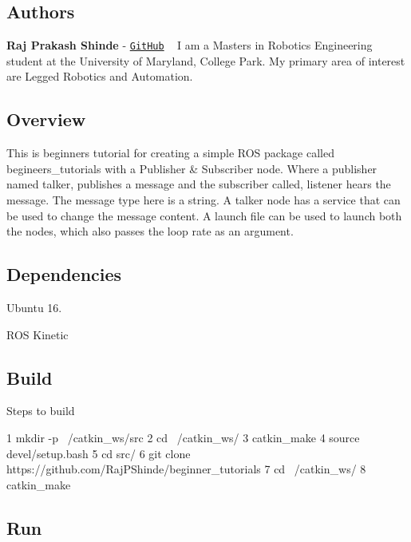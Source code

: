 \href{https://github.com/RajPShinde/begineer_tutorials/blob/master/LICENSE}{\tt } \href{https://github.com/RajPShinde/begineer_tutorials/blob/master/docs}{\tt }

\subsection*{Authors}

{\bfseries Raj Prakash Shinde} -\/ \href{https://github.com/RajPShinde}{\tt Git\+Hub} ~\newline
I am a Masters in Robotics Engineering student at the University of Maryland, College Park. My primary area of interest are Legged Robotics and Automation.

\subsection*{Overview}

This is beginners tutorial for creating a simple R\+OS package called begineers\+\_\+tutorials with a Publisher \& Subscriber node. Where a publisher named talker, publishes a message and the subscriber called, listener hears the message. The message type here is a string. A talker node has a service that can be used to change the message content. A launch file can be used to launch both the nodes, which also passes the loop rate as an argument.

\subsection*{Dependencies}


\begin{DoxyEnumerate}
\item Ubuntu 16.
\item R\+OS Kinetic
\end{DoxyEnumerate}

\subsection*{Build}

Steps to build 
\begin{DoxyCode}
1 mkdir -p ~/catkin\_ws/src
2 cd ~/catkin\_ws/
3 catkin\_make
4 source devel/setup.bash
5 cd src/
6 git clone https://github.com/RajPShinde/beginner\_tutorials
7 cd ~/catkin\_ws/
8 catkin\_make
\end{DoxyCode}


\subsection*{Run}


